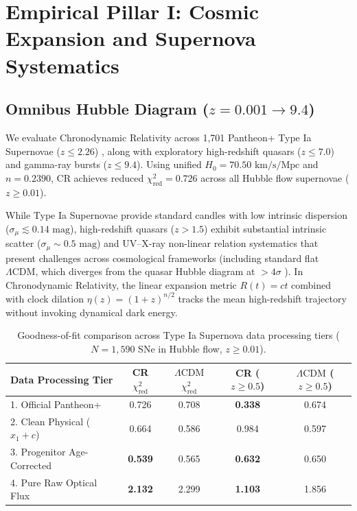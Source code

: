 \documentclass[aps,prd,reprint,superscriptaddress,nofootinbib,floatfix,amsmath,amssymb]{revtex4-2}
\begin{document}
\section{Empirical Pillar I: Cosmic Expansion and Supernova Systematics}
\label{sec:expansion}

\subsection{Omnibus Hubble Diagram \texorpdfstring{($z = 0.001 \to 9.4$)}{(z = 0.001 to 9.4)}}

We evaluate Chronodynamic Relativity across 1,701 Pantheon+ Type Ia Supernovae ($z \le 2.26$) \cite{PantheonPlus2022}, along with exploratory high-redshift quasars ($z \le 7.0$) \cite{RisalitiLusso2019,Lusso2020} and gamma-ray bursts ($z \le 9.4$). Using unified $H_0 = 70.50\text{ km/s/Mpc}$ and $n = 0.2390$, CR achieves reduced $\chi^2_{\text{red}} = 0.726$ across all Hubble flow supernovae ($z \ge 0.01$).

While Type Ia Supernovae provide standard candles with low intrinsic dispersion ($\sigma_\mu \lesssim 0.14\text{ mag}$), high-redshift quasars ($z > 1.5$) exhibit substantial intrinsic scatter ($\sigma_\mu \sim 0.5\text{ mag}$) and UV--X-ray non-linear relation systematics that present challenges across cosmological frameworks (including standard flat $\Lambda\text{CDM}$, which diverges from the quasar Hubble diagram at $>4\sigma$ \cite{RisalitiLusso2019,Lusso2020}). In Chronodynamic Relativity, the linear expansion metric $R(t) = ct$ combined with clock dilation $\eta(z) = (1+z)^{n/2}$ tracks the mean high-redshift trajectory without invoking dynamical dark energy.

\begin{table}[!t]
\caption{Goodness-of-fit comparison across Type Ia Supernova data processing tiers ($N=1,590$ SNe in Hubble flow, $z \ge 0.01$).}
\label{tab:sne_tiers}
\begin{ruledtabular}
\begin{tabular}{lcccc}
Data Processing Tier & CR $\chi^2_{\text{red}}$ & $\Lambda\text{CDM}$ $\chi^2_{\text{red}}$ & CR ($z \ge 0.5$) & $\Lambda\text{CDM}$ ($z \ge 0.5$) \\
\hline
1. Official Pantheon+ & 0.726 & 0.708 & \textbf{0.338} & 0.674 \\
2. Clean Physical ($x_1+c$) & 0.664 & 0.586 & 0.984 & 0.597 \\
3. Progenitor Age-Corrected & \textbf{0.539} & 0.565 & \textbf{0.632} & 0.650 \\
4. Pure Raw Optical Flux & \textbf{2.132} & 2.299 & \textbf{1.103} & 1.856 \\
\end{tabular}
\end{ruledtabular}
\end{table}
\end{document}
